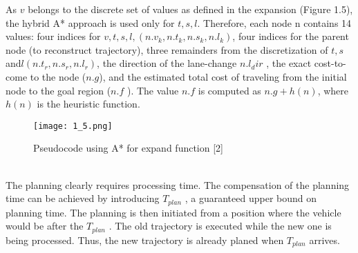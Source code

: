 \documentclass{thesisreport}
\begin{document}
\indent
As $v$ belongs to the discrete set of values as defined in the expansion (Figure 1.5), the hybrid A* approach is used only for $t, s, l$. Therefore, each node n contains 14 values: four indices for $v, t, s, l, (n.v_k , n.t_k , n.s_k , n.l_k )$, four indices for the parent node (to reconstruct trajectory), three remainders from the discretization of $t, s$ and$ l (n.t_r , n.s_r , n.l_r )$, the direction of the lane-change $n.l_dir$ , the exact
cost-to-come to the node ($n.g$), and the estimated total cost of traveling from the initial node to the goal region ($n.f$ ). The value $n.f$ is computed as $n.g + h(n)$, where $h(n)$ is the heuristic function.
   \begin{figure}[ht]
	\centering
	\texttt{[image: 1\_5.png]}
	\caption{Pseudocode using A* for expand function
		[2]}
	\label{fig:1.5} 
\end{figure}\\
\indent
The planning clearly requires processing time. The compensation of the planning time can be achieved by introducing $T_{plan}$ , a guaranteed upper bound on planning time. The planning is then initiated from a position where the vehicle would be after the $T_{plan}$ . The old trajectory is executed while the new one is being processed. Thus, the new trajectory is already planed when $T_{plan}$ arrives.
\end{document}
